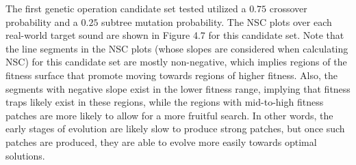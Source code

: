 \documentclass[a4paper,12pt]{report} 	%
\numberwithin{figure}{chapter}
\numberwithin{table}{chapter}
\numberwithin{equation}{chapter}
\begin{document}
\begin{flushleft}
The first genetic operation candidate set tested utilized a $0.75$ crossover probability and a $0.25$ subtree mutation probability. The NSC plots over each real-world target sound are shown in Figure 4.7 for this candidate set.
Note that the line segments in the NSC plots (whose slopes are considered when calculating NSC) for this candidate set are mostly non-negative, which implies regions of the fitness surface that promote moving towards regions of higher fitness. Also, the segments with negative slope exist in the lower fitness range, implying that fitness traps likely exist in these regions, while the regions with mid-to-high fitness patches are more likely to allow for a more fruitful search. In other words, the early stages of evolution are likely slow to produce strong patches, but once such patches are produced, they are able to evolve more easily towards optimal solutions.


\end{flushleft}
\end{document}
